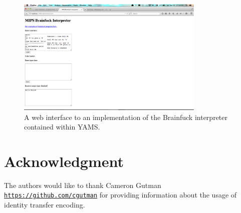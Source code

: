 \documentclass[journal,10pt]{IEEEtran}
\begin{document}
\begin{figure}[H]
\centering
\includegraphics[width=0.8\textwidth,natwidth=1440,natheight=900]{interactive_ajax}
\caption{A web interface to an implementation of the Brainfuck interpreter contained within YAMS.}
\label{fig:interactive_ajax}
\end{figure}

\twocolumn %

\section*{Acknowledgment}


The authors would like to thank Cameron Gutman
\texttt{\url{https://github.com/cgutman}} for providing information about the
usage of identity transfer encoding.



\nocite{*}

\end{document}
